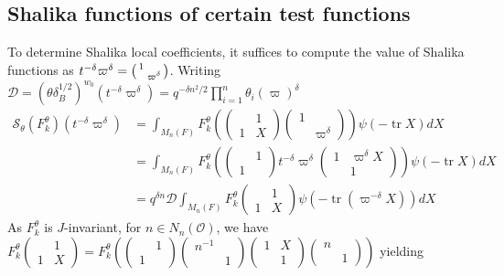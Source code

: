 \documentclass{amsart}
\theoremstyle{definition}
\newcommand{\tr}{\operatorname{tr}}
\newenvironment{spmatrix}{\left(\begin{smallmatrix}}{\end{smallmatrix}\right)}
\begin{document}
{\subsection{Shalika functions of certain test functions}\label{ss:shalika-at1}
To determine Shalika local coefficients, it suffices to compute the value of Shalika functions as 
$t^{-\delta}\varpi^\delta =\begin{spmatrix} 1&\\&\varpi^\delta\end{spmatrix}$. Writing $\mathcal{D}=(\theta\delta_B^{1/2})^{w_0}(t^{-\delta}\varpi^\delta )=q^{-\delta n^2/2}\prod\limits_{i=1}^n \theta_i(\varpi)^\delta$
\begin{align*}
\mathcal{S}_{\theta}(F^\theta_k)(t^{-\delta}\varpi^\delta )&=\int_{M_n(F)}F^\theta_k
                                     \left(\begin{pmatrix}&1\\1&X\end{pmatrix}\begin{pmatrix}
                                     1&\\&\varpi^{\delta}\end{pmatrix}\right)\psi(-\tr
  X)dX\\
  &=\int_{M_n(F)}F^\theta_k \left(\begin{pmatrix} &1\\1&\end{pmatrix}t^{-\delta}\varpi^\delta \begin{pmatrix} 1&\varpi^{\delta}X\\&1\end{pmatrix}\right)\psi(-\tr X)dX\\
  &=q^{\delta n}\mathcal{D} \int_{M_n(F)}F^\theta_k \begin{pmatrix}&1\\1&X\end{pmatrix}\psi(-\tr(\varpi^{-\delta}X))dX
\end{align*}
As  $F_k^\theta$ is $J$-invariant, for $n\in N_n(\mathcal{O})$, we have $F_k^\theta \begin{pmatrix}&1\\1&X\end{pmatrix}=F_k^\theta \left(\begin{pmatrix} &1\\1&\end{pmatrix}\begin{pmatrix} n^{-1}&\\&1\end{pmatrix}\begin{pmatrix} 1&X\\&1\end{pmatrix}\begin{pmatrix} n&\\&1\end{pmatrix}\right)$ yielding 
}
\end{document}
